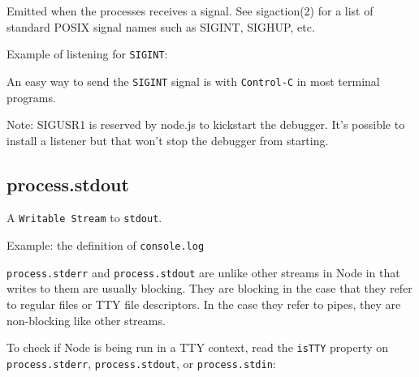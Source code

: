 Emitted when the processes receives a signal. See sigaction(2) for a
list of standard POSIX signal names such as SIGINT, SIGHUP, etc.

Example of listening for \texttt{SIGINT}:

\begin{Shaded}
\begin{Highlighting}[]
\NormalTok{();}

\NormalTok{(}\NormalTok{, }\NormalTok{() \{}
  \NormalTok{(}\NormalTok{);}
\NormalTok{\});}
\end{Highlighting}
\end{Shaded}

An easy way to send the \texttt{SIGINT} signal is with
\texttt{Control-C} in most terminal programs.

Note: SIGUSR1 is reserved by node.js to kickstart the debugger. It's
possible to install a listener but that won't stop the debugger from
starting.

\subsection{process.stdout}

A \texttt{Writable Stream} to \texttt{stdout}.

Example: the definition of \texttt{console.log}

\begin{Shaded}
\begin{Highlighting}[]
 \NormalTok{= }
  \NormalTok{);}
\NormalTok{\};}
\end{Highlighting}
\end{Shaded}

\texttt{process.stderr} and \texttt{process.stdout} are unlike other
streams in Node in that writes to them are usually blocking. They are
blocking in the case that they refer to regular files or TTY file
descriptors. In the case they refer to pipes, they are non-blocking like
other streams.

To check if Node is being run in a TTY context, read the \texttt{isTTY}
property on \texttt{process.stderr}, \texttt{process.stdout}, or
\texttt{process.stdin}:

